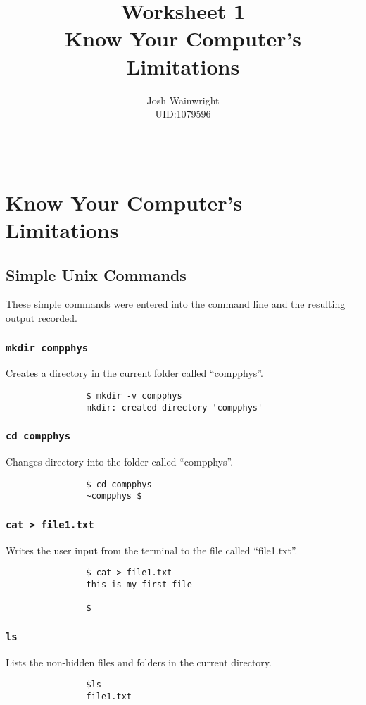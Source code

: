 \documentclass[11pt]{article} %
\author{Josh Wainwright \\ UID:1079596}
\title{Worksheet 1 \\ Know Your Computer's Limitations}
\date{}
\newcommand{\code}[1]{\texttt{#1}}
\begin{document}
\maketitle
\tableofcontents
\vspace{1cm}\hrule \vspace{1cm}

	\section{Know Your Computer's Limitations}

	\subsection{Simple Unix Commands}
	These simple commands were entered into the command line and the resulting output recorded.
	\subsubsection{\code{mkdir compphys}}
		Creates a directory in the current folder called ``compphys''.
			\begin{verbatim}
				$ mkdir -v compphys
				mkdir: created directory 'compphys'
			\end{verbatim}
	\subsubsection{\code{cd compphys}}
		Changes directory into the folder called ``compphys''.
			\begin{verbatim}
				$ cd compphys
				~compphys $
			\end{verbatim}
	\subsubsection{\code{cat > file1.txt}}
		Writes the user input from the terminal to the file called ``file1.txt''.
			\begin{verbatim}
				$ cat > file1.txt
				this is my first file

				$
			\end{verbatim}
	\subsubsection{\code{ls}}
		Lists the non-hidden files and folders in the current directory.
			\begin{verbatim}
				$ls
				file1.txt
			\end{verbatim}
\end{document}
